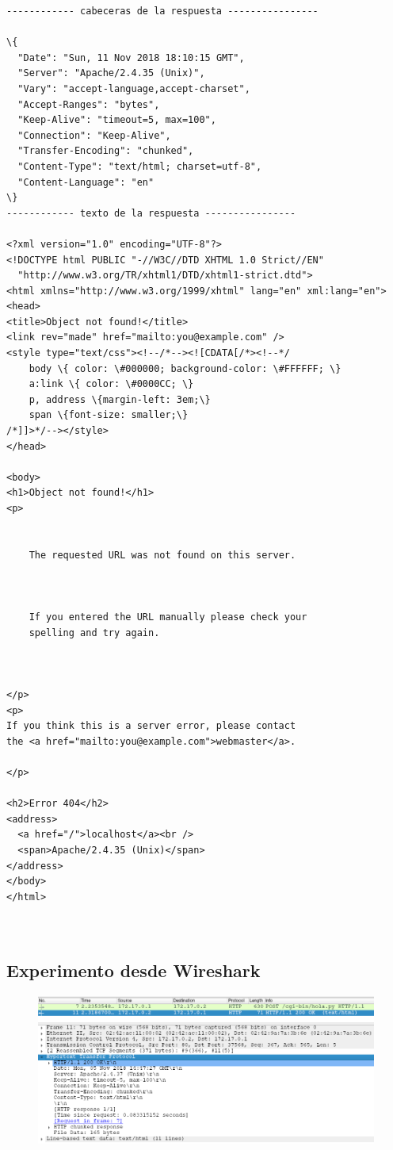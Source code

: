 \documentclass[12pt]{extarticle}
\begin{document}
    \begin{Verbatim}[commandchars=\\\{\}]
------------ cabeceras de la respuesta ----------------

\{
  "Date": "Sun, 11 Nov 2018 18:10:15 GMT",
  "Server": "Apache/2.4.35 (Unix)",
  "Vary": "accept-language,accept-charset",
  "Accept-Ranges": "bytes",
  "Keep-Alive": "timeout=5, max=100",
  "Connection": "Keep-Alive",
  "Transfer-Encoding": "chunked",
  "Content-Type": "text/html; charset=utf-8",
  "Content-Language": "en"
\}
------------ texto de la respuesta ----------------

<?xml version="1.0" encoding="UTF-8"?>
<!DOCTYPE html PUBLIC "-//W3C//DTD XHTML 1.0 Strict//EN"
  "http://www.w3.org/TR/xhtml1/DTD/xhtml1-strict.dtd">
<html xmlns="http://www.w3.org/1999/xhtml" lang="en" xml:lang="en">
<head>
<title>Object not found!</title>
<link rev="made" href="mailto:you@example.com" />
<style type="text/css"><!--/*--><![CDATA[/*><!--*/ 
    body \{ color: \#000000; background-color: \#FFFFFF; \}
    a:link \{ color: \#0000CC; \}
    p, address \{margin-left: 3em;\}
    span \{font-size: smaller;\}
/*]]>*/--></style>
</head>

<body>
<h1>Object not found!</h1>
<p>


    The requested URL was not found on this server.

  

    If you entered the URL manually please check your
    spelling and try again.

  

</p>
<p>
If you think this is a server error, please contact
the <a href="mailto:you@example.com">webmaster</a>.

</p>

<h2>Error 404</h2>
<address>
  <a href="/">localhost</a><br />
  <span>Apache/2.4.35 (Unix)</span>
</address>
</body>
</html>



    \end{Verbatim}

    \subsection{Experimento desde
Wireshark}\label{experimento-desde-wireshark}

\begin{figure}
\centering
\includegraphics{images/pto1.png}
\caption{}
\end{figure}
\end{document}
